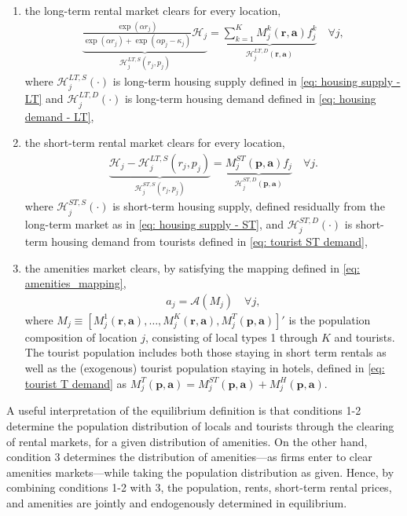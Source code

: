 \documentclass[11pt]{article}
\begin{document}
\begin{enumerate}
    \item the long-term rental market clears for every location,
    \begin{align*}
     \underbrace{\frac{\exp(\alpha r_{j})}{\exp(\alpha r_{j})+\exp( \alpha p_{j}-\kappa_{j})} \mathcal{H}_{j} }_{\mathcal{H}^{LT,S}_{j}(r_{j}, p_{j})} =  \underbrace{\sum_{k=1}^K M_j^k(\mathbf{r}, \mathbf{a})f^k_j }_{\mathcal{H}_j^{LT,D}(\mathbf{r}, \mathbf{a})} \quad \forall j,
    \end{align*}
    where $\mathcal{H}^{LT,S}_{j}(\cdot)$ is long-term housing supply defined in \ref{eq: housing supply - LT} and $\mathcal{H}_j^{LT,D}(\cdot)$ is long-term housing demand defined in \ref{eq: housing demand - LT},
    \item the short-term rental market clears for every location,
    \begin{align*}
     \underbrace{\mathcal{H}_{j} - \mathcal{H}^{LT,S}_{j}(r_{j}, p_{j})}_{\mathcal{H}^{ST,S}_{j}(r_{j}, p_{j})} =   \underbrace{M^{ST}_{j}(\mathbf{p}, \mathbf{a}) f_{j}}_{\mathcal{H}^{ST,D}_{j}(\mathbf{p}, \mathbf{a})} \quad \forall j.
    \end{align*}
    where $\mathcal{H}^{ST,S}_{j}(\cdot)$ is short-term housing supply, defined residually from the long-term market as in \ref{eq: housing supply - ST}, and $\mathcal{H}^{ST,D}_{j}(\cdot)$ is short-term housing demand from tourists defined in \ref{eq: tourist ST demand},
    \item the amenities market clears, by satisfying the mapping defined in \ref{eq: amenities_mapping},
    \begin{align*}
    a_j = \mathcal{A}(M_j) \quad \forall j,
    \end{align*}
    where $M_j \equiv [M_{j}^1(\mathbf{r}, \mathbf{a}),\dots, M_{j}^K(\mathbf{r}, \mathbf{a}), M_{j}^T(\mathbf{p}, \mathbf{a})]'$ is the population composition of location $j$, consisting of local types 1 through $K$ and tourists. The tourist population includes both those staying in short term rentals as well as the (exogenous) tourist population staying in hotels, defined in \ref{eq: tourist T demand} as $M^{T}_{j}(\mathbf{p}, \mathbf{a}) = M^{ST}_{j}(\mathbf{p}, \mathbf{a}) +  M^{H}_{j}(\mathbf{p}, \mathbf{a}) $.
\end{enumerate}

A useful interpretation of the equilibrium definition is that conditions 1-2 determine the population distribution of locals and tourists through the clearing of rental markets, for a given distribution of amenities. On the other hand, condition 3 determines the distribution of amenities---as firms enter to clear amenities markets---while taking the population distribution as given. Hence, by combining conditions 1-2 with  3, the population, rents, short-term rental prices, and amenities are jointly and endogenously determined in equilibrium. 
\end{document}
